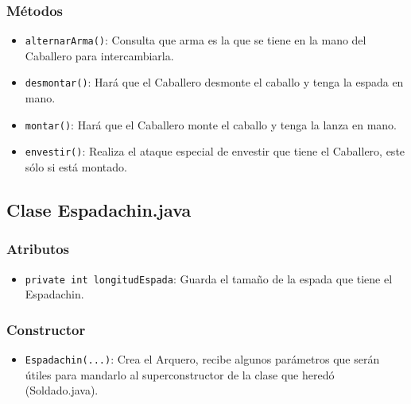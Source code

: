 \documentclass{article}
\begin{document}
\subsubsection{Métodos}
\begin{itemize}
        \item \texttt{alternarArma()}: Consulta que arma es la que se tiene en la mano del Caballero para intercambiarla. 
        \item \texttt{desmontar()}: Hará que el Caballero desmonte el caballo y tenga la espada en mano. 
        \item \texttt{montar()}: Hará que el Caballero monte el caballo y tenga la lanza en mano.
        \item \texttt{envestir()}: Realiza el ataque especial de envestir que tiene el Caballero, este sólo si está montado.
\end{itemize}




\newpage %


\subsection{Clase Espadachin.java}
\subsubsection{Atributos}
\begin{itemize}
    \item \texttt{private int longitudEspada}: Guarda el tamaño de la espada que tiene el Espadachin.
\end{itemize}


\subsubsection{Constructor}
\begin{itemize}
    \item \texttt{Espadachin(...)}: Crea el Arquero, recibe algunos parámetros que serán útiles para mandarlo al superconstructor de la clase que heredó (Soldado.java).
\end{itemize}

\end{document}
